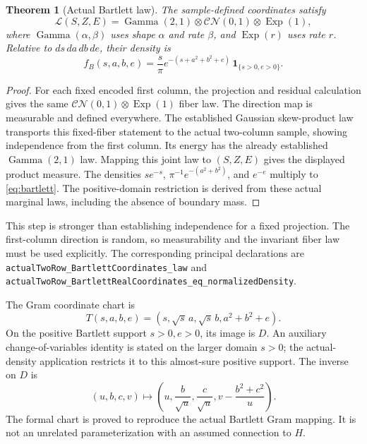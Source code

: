 \documentclass[11pt]{article}
\newtheorem{theorem}{Theorem}[section]
\newcommand{\CN}{\mathcal{CN}}
\newcommand{\Law}{\mathcal L}
\newcommand{\lean}[1]{{\small\nolinkurl{#1}}}
\begin{document}
\begin{theorem}[Actual Bartlett law]\label{thm:bartlett}
The sample-defined coordinates satisfy
\[
 \Law(S,Z,E)=\operatorname{Gamma}(2,1)\otimes\CN(0,1)
                       \otimes\operatorname{Exp}(1),
\]
where $\operatorname{Gamma}(\alpha,\beta)$ uses shape $\alpha$ and rate $\beta$,
and $\operatorname{Exp}(r)$ uses rate $r$. Relative to
$ds\,da\,db\,de$, their density is
\begin{equation}\label{eq:bartlett}
 f_B(s,a,b,e)=\frac{s}{\pi}
           e^{-(s+a^2+b^2+e)}\,\mathbf1_{\{s>0,e>0\}}.
\end{equation}
\end{theorem}
\begin{proof}
For each fixed encoded first column, the projection and residual calculation
gives the same $\CN(0,1)\otimes\operatorname{Exp}(1)$ fiber law.
The direction map is measurable and defined everywhere. The established
Gaussian skew-product law transports this fixed-fiber statement to the actual
two-column sample, showing independence from the first column. Its energy
has the already established $\operatorname{Gamma}(2,1)$ law. Mapping this joint
law to $(S,Z,E)$ gives the displayed product measure.
The densities $s e^{-s}$, $\pi^{-1}e^{-(a^2+b^2)}$, and $e^{-e}$ multiply to
\eqref{eq:bartlett}. The positive-domain restriction is derived from these
actual marginal laws, including the absence of boundary mass.
\end{proof}

This step is stronger than establishing independence for a fixed projection.
The first-column direction is random, so measurability and the invariant fiber
law must be used explicitly. The corresponding principal declarations are
\lean{actualTwoRow_BartlettCoordinates_law} and
\lean{actualTwoRow_BartlettRealCoordinates_eq_normalizedDensity}.

The Gram coordinate chart is
\begin{equation}\label{eq:chart}
 T(s,a,b,e)=(s,\sqrt{s}\,a,\sqrt{s}\,b,a^2+b^2+e).
\end{equation}
On the positive Bartlett support $s>0,e>0$, its image is $D$.
An auxiliary change-of-variables identity is stated on the larger domain
$s>0$; the actual-density application restricts it to this almost-sure
positive support. The inverse on $D$ is
\[
 (u,b,c,v)\longmapsto
 \left(u,\frac b{\sqrt u},\frac c{\sqrt u},
             v-\frac{b^2+c^2}{u}\right).
\]
The formal chart is proved to reproduce the actual Bartlett Gram mapping.
It is not an unrelated parameterization with an assumed connection to $H$.
\end{document}
